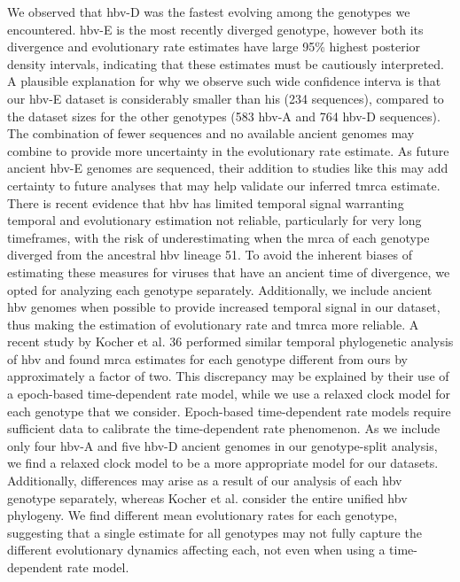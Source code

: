 We observed that \gls{hbv}-D was the fastest evolving among the genotypes we encountered.
\gls{hbv}-E is the most recently diverged genotype, however both its divergence and evolutionary rate estimates have large 95\% highest posterior density intervals, indicating that these estimates must be cautiously interpreted.
A plausible explanation for why we observe such wide confidence interva is that our \gls{hbv}-E dataset is considerably smaller than his (234 sequences), compared to the dataset sizes for the other genotypes (583 \gls{hbv}-A and 764 \gls{hbv}-D sequences).
The combination of fewer sequences and no available ancient genomes may combine to provide more uncertainty in the evolutionary rate estimate.
As future ancient \gls{hbv}-E genomes are sequenced, their addition to studies like this may add certainty to future analyses that may help validate our inferred \gls{tmrca} estimate.\\

There is recent evidence that \gls{hbv} has limited temporal signal warranting temporal and evolutionary estimation not reliable, particularly for very long timeframes, with the risk of underestimating when the \gls{mrca} of each genotype diverged from the ancestral \gls{hbv} lineage 51.
To avoid the inherent biases of estimating these measures for viruses that have an ancient time of divergence, we opted for analyzing each genotype separately.
Additionally, we include ancient \gls{hbv} genomes when possible to provide increased temporal signal in our dataset, thus making the estimation of evolutionary rate and \gls{tmrca} more reliable.
A recent study by Kocher et al. 36 performed similar temporal phylogenetic analysis of \gls{hbv} and found \gls{mrca} estimates for each genotype different from ours by approximately a factor of two.
This discrepancy may be explained by their use of a epoch-based time-dependent rate model, while we use a relaxed clock model for each genotype that we consider.
Epoch-based time-dependent rate models require sufficient data to calibrate the time-dependent rate phenomenon.
As we include only four \gls{hbv}-A and five \gls{hbv}-D ancient genomes in our genotype-split analysis, we find a relaxed clock model to be a more appropriate model for our datasets.
Additionally, differences may arise as a result of our analysis of each \gls{hbv} genotype separately, whereas Kocher et al. consider the entire unified \gls{hbv} phylogeny.
We find different mean evolutionary rates for each genotype, suggesting that a single estimate for all genotypes may not fully capture the different evolutionary dynamics affecting each, not even when using a time-dependent rate model.\\

